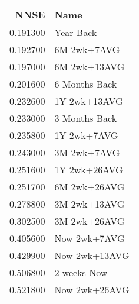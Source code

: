 \begin{tabular}{rl}
NNSE & Name \\
\hline
0.191300 & Year Back \\
0.192700 & 6M 2wk+7AVG \\
0.197000 & 6M 2wk+13AVG \\
0.201600 & 6 Months Back \\
0.232600 & 1Y 2wk+13AVG \\
0.233000 & 3 Months Back \\
0.235800 & 1Y 2wk+7AVG \\
0.243000 & 3M 2wk+7AVG \\
0.251600 & 1Y 2wk+26AVG \\
0.251700 & 6M 2wk+26AVG \\
0.278800 & 3M 2wk+13AVG \\
0.302500 & 3M 2wk+26AVG \\
0.405600 & Now 2wk+7AVG \\
0.429900 & Now 2wk+13AVG \\
0.506800 & 2 weeks Now \\
0.521800 & Now 2wk+26AVG \\
\hline
\end{tabular}
